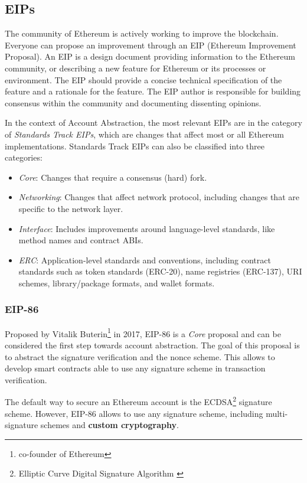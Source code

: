 \subsection{EIPs}
\label{subsec:eips}

The community of Ethereum is actively working to improve the blockchain. Everyone can propose an improvement through an EIP (Ethereum Improvement Proposal). An EIP is a design document providing information to the Ethereum community, or describing a new feature for Ethereum or its processes or environment. The EIP should provide a concise technical specification of the feature and a rationale for the feature. The EIP author is responsible for building consensus within the community and documenting dissenting opinions. \cite{eip-1}

In the context of Account Abstraction, the most relevant EIPs are in the category of \textit{Standards Track EIPs}, which are changes that affect most or all Ethereum implementations. Standards Track EIPs can also be classified into three categories: \cite{eip-1}
\begin{itemize}
    \item \textit{Core}: Changes that require a consensus (hard) fork.
    \item \textit{Networking}: Changes that affect network protocol, including changes that are specific to the network layer.
    \item \textit{Interface}: Includes improvements around language-level standards, like method names and contract ABIs.
    \item \textit{ERC}: Application-level standards and conventions, including contract standards such as token standards (ERC-20), name registries (ERC-137), URI schemes, library/package formats, and wallet formats.
\end{itemize}

\subsubsection{EIP-86}
\label{subsubsec:eip-86}

Proposed by Vitalik Buterin\footnote{co-founder of Ethereum} in 2017, EIP-86 is a \textit{Core} proposal and can be considered the first step towards account abstraction. The goal of this proposal is to abstract the signature verification and the nonce scheme. This allows to develop smart contracts able to use any signature scheme in transaction verification. \cite{eip-86}

The default way to secure an Ethereum account is the ECDSA\footnote{Elliptic Curve Digital Signature Algorithm \cite{ECDSA}} signature scheme. However, EIP-86 allows to use any signature scheme, including multi-signature schemes and \textbf{custom cryptography}. \cite{eip-86}

